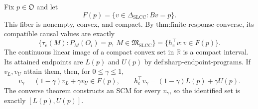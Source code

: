 Fix \(p\in\mathfrak O\) and let
\[
F(p)=\{v\in\Delta_{\mathrm{SLCC}}:Bv=p\}.
\]
This fiber is nonempty, convex, and compact.  By \(\text{thm:finite-response-converse}\), its compatible causal values are exactly
\[
\{\tau_e(M):P_M(O_i)=p,\ M\in\mathfrak M_{\mathrm{SLCC}}\}
=\{h_e^{\top}v:v\in F(p)\}.
\]
The continuous linear image of a compact convex set in \(\mathbb R\) is a compact interval.  Its attained endpoints are \(L(p)\) and \(U(p)\) by \(\text{def:sharp-endpoint-programs}\).  If \(v_L,v_U\) attain them, then, for \(0\leq\gamma\leq1\),
\[
v_\gamma=(1-\gamma)v_L+\gamma v_U\in F(p),\qquad
h_e^{\top}v_\gamma=(1-\gamma)L(p)+\gamma U(p).
\]
The converse theorem constructs an SCM for every \(v_\gamma\), so the identified set is exactly \([L(p),U(p)]\).